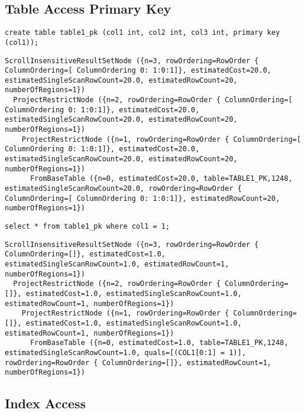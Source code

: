 \subsection{Table Access Primary Key}
\begin{verbatim}
create table table1_pk (col1 int, col2 int, col3 int, primary key (col1)); 
\end{verbatim}
\begin{verbatim}
ScrollInsensitiveResultSetNode ({n=3, rowOrdering=RowOrder { ColumnOrdering=[ ColumnOrdering 0: 1:0:1]}, estimatedCost=20.0, estimatedSingleScanRowCount=20.0, estimatedRowCount=20, numberOfRegions=1})
  ProjectRestrictNode ({n=2, rowOrdering=RowOrder { ColumnOrdering=[ ColumnOrdering 0: 1:0:1]}, estimatedCost=20.0, estimatedSingleScanRowCount=20.0, estimatedRowCount=20, numberOfRegions=1})
    ProjectRestrictNode ({n=1, rowOrdering=RowOrder { ColumnOrdering=[ ColumnOrdering 0: 1:0:1]}, estimatedCost=20.0, estimatedSingleScanRowCount=20.0, estimatedRowCount=20, numberOfRegions=1})
      FromBaseTable ({n=0, estimatedCost=20.0, table=TABLE1_PK,1248, estimatedSingleScanRowCount=20.0, rowOrdering=RowOrder { ColumnOrdering=[ ColumnOrdering 0: 1:0:1]}, estimatedRowCount=20, numberOfRegions=1})
\end{verbatim}      

\begin{verbatim}
select * from table1_pk where col1 = 1;
\end{verbatim}

\begin{verbatim}
ScrollInsensitiveResultSetNode ({n=3, rowOrdering=RowOrder { ColumnOrdering=[]}, estimatedCost=1.0, estimatedSingleScanRowCount=1.0, estimatedRowCount=1, numberOfRegions=1})
  ProjectRestrictNode ({n=2, rowOrdering=RowOrder { ColumnOrdering=[]}, estimatedCost=1.0, estimatedSingleScanRowCount=1.0, estimatedRowCount=1, numberOfRegions=1})
    ProjectRestrictNode ({n=1, rowOrdering=RowOrder { ColumnOrdering=[]}, estimatedCost=1.0, estimatedSingleScanRowCount=1.0, estimatedRowCount=1, numberOfRegions=1})
      FromBaseTable ({n=0, estimatedCost=1.0, table=TABLE1_PK,1248, estimatedSingleScanRowCount=1.0, quals=[(COL1[0:1] = 1)], rowOrdering=RowOrder { ColumnOrdering=[]}, estimatedRowCount=1, numberOfRegions=1})
\end{verbatim}


\subsection{Index Access}

